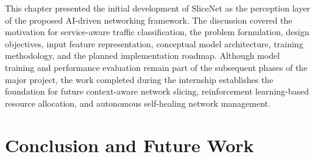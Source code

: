 \documentclass[12pt,a4paper]{report}
\begin{document}

	This chapter presented the initial development of SliceNet as the perception layer of the proposed AI-driven networking framework. The discussion covered the motivation for service-aware traffic classification, the problem formulation, design objectives, input feature representation, conceptual model architecture, training methodology, and the planned implementation roadmap. Although model training and performance evaluation remain part of the subsequent phases of the major project, the work completed during the internship establishes the foundation for future context-aware network slicing, reinforcement learning-based resource allocation, and autonomous self-healing network management.

	
	\chapter{Conclusion and Future Work}
	\label{chap:conclusion}
	
\end{document}
